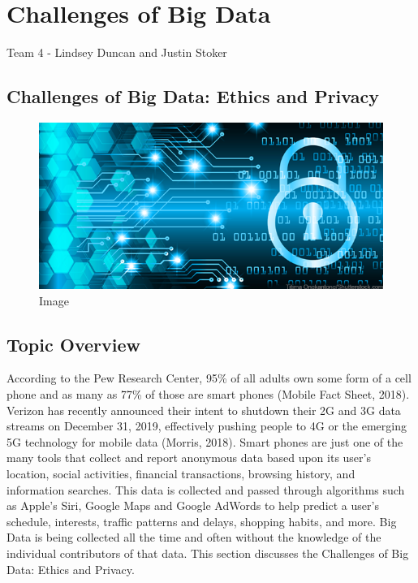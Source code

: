 \documentclass[]{book}
\begin{document}
\hypertarget{challenges-of-big-data}{%
\chapter{Challenges of Big Data}\label{challenges-of-big-data}}

Team 4 - Lindsey Duncan and Justin Stoker

\hypertarget{challenges-of-big-data-ethics-and-privacy}{%
\section{Challenges of Big Data: Ethics and Privacy}\label{challenges-of-big-data-ethics-and-privacy}}

\begin{figure}
\centering
\includegraphics{../images/cybersecurity2.png}
\caption{Image}
\end{figure}

\hypertarget{topic-overview-3}{%
\section{Topic Overview}\label{topic-overview-3}}

According to the Pew Research Center, 95\% of all adults own some form of a cell phone and as many as 77\% of those are smart phones (Mobile Fact Sheet, 2018). Verizon has recently announced their intent to shutdown their 2G and 3G data streams on December 31, 2019, effectively pushing people to 4G or the emerging 5G technology for mobile data (Morris, 2018). Smart phones are just one of the many tools that collect and report anonymous data based upon its user's location, social activities, financial transactions, browsing history, and information searches. This data is collected and passed through algorithms such as Apple's Siri, Google Maps and Google AdWords to help predict a user's schedule, interests, traffic patterns and delays, shopping habits, and more. Big Data is being collected all the time and often without the knowledge of the individual contributors of that data. This section discusses the Challenges of Big Data: Ethics and Privacy.
\end{document}
